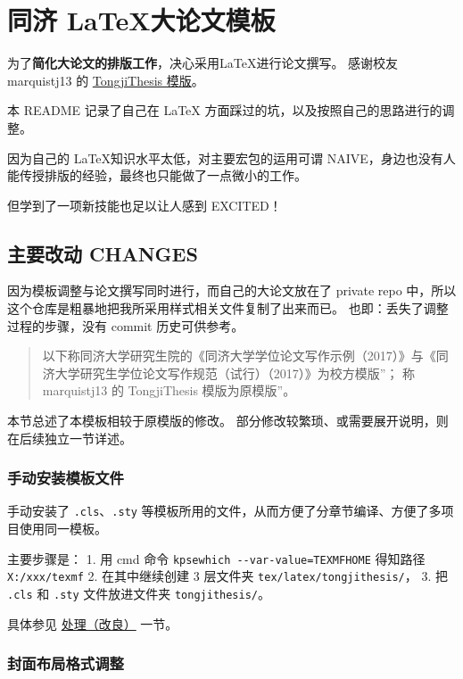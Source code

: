 \documentclass[../Main/thesis.tex]{subfiles}
\begin{document}
\chapter{同济 \LaTeX 大论文模板}

为了\textbf{简化大论文的排版工作}，决心采用LaTeX进行论文撰写。 感谢校友
marquistj13 的
\href{https://github.com/marquistj13/TongjiThesis}{TongjiThesis 模版}。

本 README 记录了自己在 \LaTeX{} 方面踩过的坑，以及按照自己的思路进行的调整。

因为自己的 \LaTeX 知识水平太低，对主要宏包的运用可谓
NAIVE，身边也没有人能传授排版的经验，最终也只能做了一点微小的工作。

但学到了一项新技能也足以让人感到 EXCITED！

\section{主要改动 CHANGES}

因为模板调整与论文撰写同时进行，而自己的大论文放在了 private repo
中，所以这个仓库是粗暴地把我所采用样式相关文件复制了出来而已。
也即：丢失了调整过程的步骤，没有 commit 历史可供参考。

\begin{quote}
以下称同济大学研究生院的《同济大学学位论文写作示例（2017）》与《同济大学研究生学位论文写作规范（试行）（2017）》为校方模版''；
称 marquistj13 的 TongjiThesis 模版为原模版''。
\end{quote}

本节总述了本模板相较于原模版的修改。
部分修改较繁琐、或需要展开说明，则在后续独立一节详述。

\subsection{手动安装模板文件}

手动安装了 \texttt{.cls}、\texttt{.sty}
等模板所用的文件，从而方便了分章节编译、方便了多项目使用同一模板。

主要步骤是： 1. 用 cmd 命令 \texttt{kpsewhich\ -\/-var-value=TEXMFHOME}
得知路径 \texttt{X:/xxx/texmf} 2. 在其中继续创建 3 层文件夹
\texttt{tex/latex/tongjithesis/}， 3. 把 \texttt{.cls} 和 \texttt{.sty}
文件放进文件夹 \texttt{tongjithesis/}。

具体参见
\protect\hyperlink{ux5cux25e5ux5cux25a4ux5cux2584ux5cux25e7ux5cux2590ux5cux2586ux5cux25e6ux5cux2594ux5cux25b9ux5cux25e8ux5cux2589ux5cux25af}{处理（改良）}
一节。

\subsection{封面布局格式调整}
\end{document}
